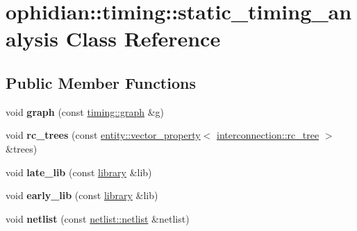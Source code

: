 \hypertarget{classophidian_1_1timing_1_1static__timing__analysis}{\section{ophidian\-:\-:timing\-:\-:static\-\_\-timing\-\_\-analysis Class Reference}
\label{classophidian_1_1timing_1_1static__timing__analysis}
}
\subsection*{Public Member Functions}
\begin{DoxyCompactItemize}
\item 
\hypertarget{classophidian_1_1timing_1_1static__timing__analysis_a1ec4043e2d269b5a8c637d09464a3454}{void {\bfseries graph} (const \hyperlink{classophidian_1_1timing_1_1graph}{timing\-::graph} \&g)}\label{classophidian_1_1timing_1_1static__timing__analysis_a1ec4043e2d269b5a8c637d09464a3454}

\item 
\hypertarget{classophidian_1_1timing_1_1static__timing__analysis_a445b401a59c35ab8df965a63de5067fe}{void {\bfseries rc\-\_\-trees} (const \hyperlink{classophidian_1_1entity_1_1vector__property}{entity\-::vector\-\_\-property}$<$ \hyperlink{classophidian_1_1interconnection_1_1rc__tree}{interconnection\-::rc\-\_\-tree} $>$ \&trees)}\label{classophidian_1_1timing_1_1static__timing__analysis_a445b401a59c35ab8df965a63de5067fe}

\item 
\hypertarget{classophidian_1_1timing_1_1static__timing__analysis_a2d883dfeb217ef975052f4f106d253b3}{void {\bfseries late\-\_\-lib} (const \hyperlink{classophidian_1_1timing_1_1library}{library} \&lib)}\label{classophidian_1_1timing_1_1static__timing__analysis_a2d883dfeb217ef975052f4f106d253b3}

\item 
\hypertarget{classophidian_1_1timing_1_1static__timing__analysis_ab575b843a38a4d8e019ddaf746b4f050}{void {\bfseries early\-\_\-lib} (const \hyperlink{classophidian_1_1timing_1_1library}{library} \&lib)}\label{classophidian_1_1timing_1_1static__timing__analysis_ab575b843a38a4d8e019ddaf746b4f050}

\item 
\hypertarget{classophidian_1_1timing_1_1static__timing__analysis_a85ed618eaa5f2860648e4d4f4e2cf8e2}{void {\bfseries netlist} (const \hyperlink{classophidian_1_1netlist_1_1netlist}{netlist\-::netlist} \&netlist)}\label{classophidian_1_1timing_1_1static__timing__analysis_a85ed618eaa5f2860648e4d4f4e2cf8e2}


\end{DoxyCompactItemize}
